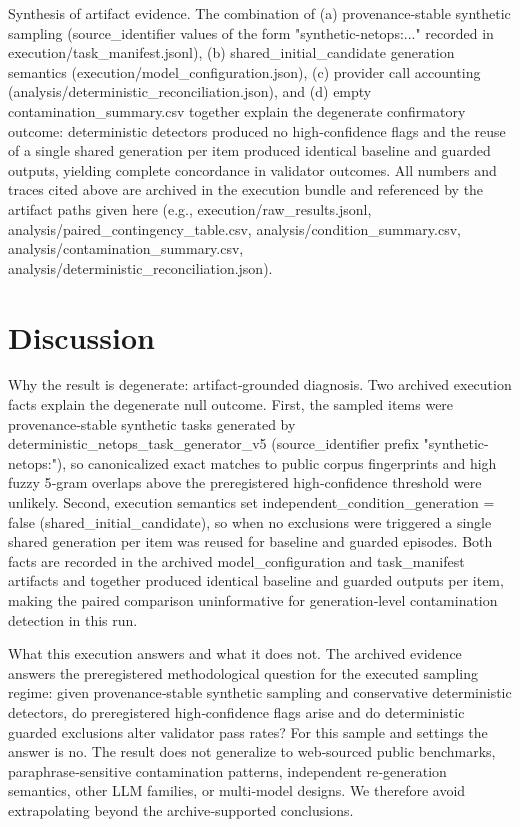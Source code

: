 \documentclass[conference]{IEEEtran}
\begin{document}
Synthesis of artifact evidence. The combination of (a) provenance‑stable synthetic sampling (source\_identifier values of the form "synthetic-netops:..." recorded in execution/task\_manifest.jsonl), (b) shared\_initial\_candidate generation semantics (execution/model\_configuration.json), (c) provider call accounting (analysis/deterministic\_reconciliation.json), and (d) empty contamination\_summary.csv together explain the degenerate confirmatory outcome: deterministic detectors produced no high‑confidence flags and the reuse of a single shared generation per item produced identical baseline and guarded outputs, yielding complete concordance in validator outcomes. All numbers and traces cited above are archived in the execution bundle and referenced by the artifact paths given here (e.g., execution/raw\_results.jsonl, analysis/paired\_contingency\_table.csv, analysis/condition\_summary.csv, analysis/contamination\_summary.csv, analysis/deterministic\_reconciliation.json).

\section{Discussion}
Why the result is degenerate: artifact‑grounded diagnosis. Two archived execution facts explain the degenerate null outcome. First, the sampled items were provenance‑stable synthetic tasks generated by deterministic\_netops\_task\_generator\_v5 (source\_identifier prefix "synthetic-netops:"), so canonicalized exact matches to public corpus fingerprints and high fuzzy 5‑gram overlaps above the preregistered high‑confidence threshold were unlikely. Second, execution semantics set independent\_condition\_generation = false (shared\_initial\_candidate), so when no exclusions were triggered a single shared generation per item was reused for baseline and guarded episodes. Both facts are recorded in the archived model\_configuration and task\_manifest artifacts and together produced identical baseline and guarded outputs per item, making the paired comparison uninformative for generation‑level contamination detection in this run.

What this execution answers and what it does not. The archived evidence answers the preregistered methodological question for the executed sampling regime: given provenance‑stable synthetic sampling and conservative deterministic detectors, do preregistered high‑confidence flags arise and do deterministic guarded exclusions alter validator pass rates? For this sample and settings the answer is no. The result does not generalize to web‑sourced public benchmarks, paraphrase‑sensitive contamination patterns, independent re‑generation semantics, other LLM families, or multi‑model designs. We therefore avoid extrapolating beyond the archive‑supported conclusions.
\end{document}

